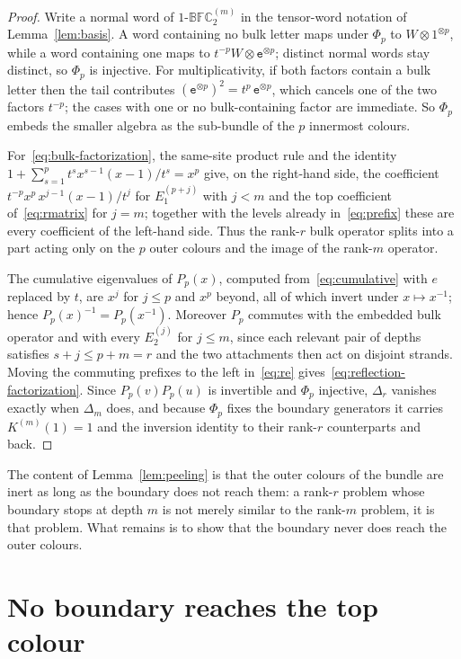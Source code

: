 \documentclass[
  aps,pre,
  reprint,
  superscriptaddress,
  amsmath,amssymb,
  floatfix
]{revtex4-2}
\theoremstyle{plain}
\theoremstyle{definition}
\theoremstyle{remark}
\newcommand{\BFCm}{1\text{-}\mathbb{BFC}^{(m)}_2}
\begin{document}
\begin{proof}
Write a normal word of $\BFCm$ in the tensor-word notation of
Lemma~\ref{lem:basis}. A word containing no bulk letter maps under $\Phi_p$ to
$W\otimes1^{\otimes p}$, while a word containing one maps to
$t^{-p}W\otimes\mathtt{e}^{\otimes p}$; distinct normal words stay distinct, so
$\Phi_p$ is injective. For multiplicativity, if both factors contain a bulk
letter then the tail contributes $(\mathtt{e}^{\otimes p})^2=t^{p}\,
\mathtt{e}^{\otimes p}$, which cancels one of the two factors $t^{-p}$; the
cases with one or no bulk-containing factor are immediate. So $\Phi_p$ embeds
the smaller algebra as the sub-bundle of the $p$ innermost colours.

For~\eqref{eq:bulk-factorization}, the same-site product rule and the identity
$1+\sum_{s=1}^{p}t^sx^{s-1}(x-1)/t^s=x^{p}$ give, on the right-hand side, the
coefficient $t^{-p}x^{p}\,x^{j-1}(x-1)/t^{j}$ for $E_1^{(p+j)}$ with $j<m$ and
the top coefficient of~\eqref{eq:rmatrix} for $j=m$; together with the levels
already in~\eqref{eq:prefix} these are every coefficient of the left-hand side.
Thus the rank-$r$ bulk operator splits into a part acting only on the $p$ outer
colours and the image of the rank-$m$ operator.

The cumulative eigenvalues of $P_p(x)$, computed
from~\eqref{eq:cumulative} with $e$ replaced by $t$, are $x^j$ for $j\le p$ and
$x^{p}$ beyond, all of which invert under $x\mapsto x^{-1}$; hence
$P_p(x)^{-1}=P_p(x^{-1})$. Moreover $P_p$ commutes with the embedded bulk
operator and with every $E_2^{(j)}$ for $j\le m$, since each relevant pair of
depths satisfies $s+j\le p+m=r$ and the two attachments then act on disjoint
strands. Moving the commuting prefixes to the left in~\eqref{eq:re}
gives~\eqref{eq:reflection-factorization}. Since $P_p(v)P_p(u)$ is invertible
and $\Phi_p$ injective, $\Delta_r$ vanishes exactly when $\Delta_m$ does, and
because $\Phi_p$ fixes the boundary generators it carries $K^{(m)}(1)=1$ and
the inversion identity to their rank-$r$ counterparts and back.
\end{proof}

The content of Lemma~\ref{lem:peeling} is that the outer colours of the bundle
are inert as long as the boundary does not reach them: a rank-$r$ problem whose
boundary stops at depth $m$ is not merely similar to the rank-$m$ problem, it
is that problem. What remains is to show that the boundary never does reach the
outer colours.

\section{No boundary reaches the top colour}
\label{sec:primitive}
\end{document}
